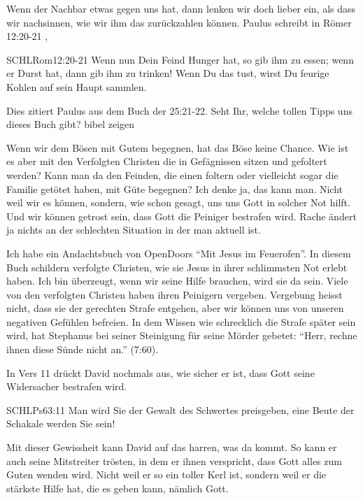 \documentclass[fontsize=16pt]{mybib}
\begin{document}
    \begin{otsblock}
    Wenn der Nachbar etwas gegen uns hat, dann lenken wir doch lieber ein, als dass wir nachsinnen, wie wir ihm das zurückzahlen können. Paulus schreibt in Römer 12:20-21 , 
    \begin{bibelbox}{SCHL}{Rom}{12:20-21}
        Wenn nun Dein Feind Hunger hat, so gib ihm zu essen; wenn er Durst hat, dann gib ihm zu trinken! Wenn Du das tust, wirst Du feurige Kohlen auf sein Haupt sammlen.
    \end{bibelbox}
    Dies zitiert Paulus aus dem Buch der  {25:21-22}. Seht Ihr, welche tollen Tipps uns dieses Buch gibt? {bibel zeigen}

    Wenn wir dem Bösen mit Gutem begegnen, hat das Böse keine Chance. Wie ist es aber mit den Verfolgten Christen die in Gefägnissen sitzen und gefoltert werden? Kann man da den Feinden, die einen foltern oder vielleicht sogar die Familie getötet haben, mit Güte begegnen? Ich denke ja, das kann man. Nicht weil wir es können, sondern, wie schon gesagt, uns uns Gott in solcher Not hilft. Und wir können getrost sein, dass Gott die Peiniger bestrafen wird. Rache ändert ja nichts an der schlechten Situation in der man aktuell ist. 
    
    Ich habe ein Andachtsbuch von OpenDoors \enquote{Mit Jesus im Feuerofen}. In diesem Buch schildern verfolgte Christen, wie sie Jesus in ihrer schlimmsten Not erlebt haben. Ich bin überzeugt, wenn wir seine Hilfe brauchen, wird sie da sein. Viele von den verfolgten Christen haben ihren Peinigern vergeben. Vergebung heisst nicht, dass sie der gerechten Strafe entgehen, aber wir können uns von unseren negativen Gefühlen befreien. In dem Wissen wie schrecklich die Strafe später sein wird, hat Stephanus bei seiner Steinigung für seine Mörder gebetet: \enquote{Herr, rechne ihnen diese Sünde nicht an.} (7:60).
\end{otsblock}
\begin{otsblock}
    In Vers 11 drückt David nochmals aus, wie sicher er ist, dass Gott seine Widersacher bestrafen wird.
    \begin{bibelbox}{SCHL}{Ps}{63:11}
        Man wird Sie der Gewalt des Schwertes preisgeben, eine Beute der Schakale werden Sie sein!
    \end{bibelbox}
    Mit dieser Gewissheit kann David auf das harren, was da kommt. So kann er auch seine Mitstreiter trösten, in dem er ihnen verspricht, dass Gott alles zum Guten wenden wird. 
    Nicht weil er so ein toller Kerl ist, sondern weil er die stärkste Hilfe hat, die es geben kann, nämlich Gott. 
\end{otsblock}
\end{document}
